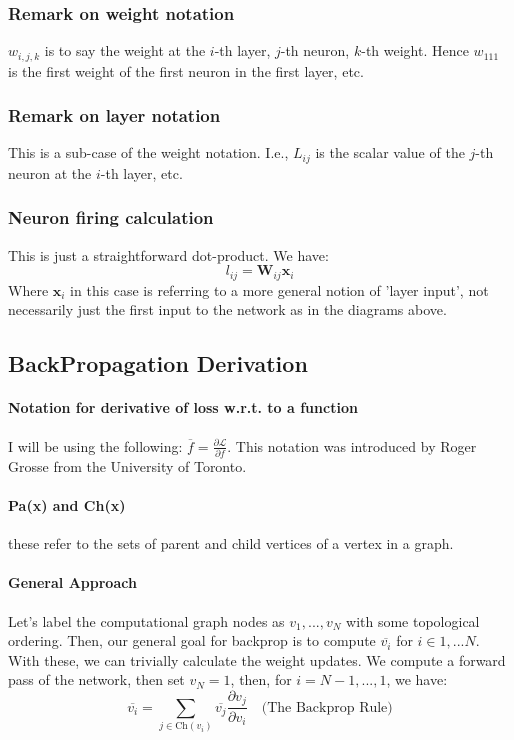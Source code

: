 \documentclass{article}
\begin{document}
\subsubsection{Remark on weight notation}
$w_{i,j,k}$ is to say the weight at the $i$-th layer, $j$-th neuron, $k$-th weight.
Hence $w_{111}$ is the first weight of the first neuron in the first layer, etc.
\subsubsection{Remark on layer notation}
This is a sub-case of the weight notation. I.e., $L_{ij}$ is the scalar value of the $j$-th neuron at the $i$-th layer, etc.
\subsubsection{Neuron firing calculation} This is just a straightforward dot-product. We have:
\[l_{ij}=\bm{W}_{ij}\bm{x}_i \]
Where $\bm{x}_i$ in this case is referring to a more general notion of 'layer input', not necessarily just the first input to the network as in the diagrams above.
\subsection{BackPropagation Derivation}
\paragraph{Notation for derivative of loss w.r.t. to a function} I will be using the following: $\overline{f} = \frac{\partial{\mathcal{L}}}{\partial{f}}$. This notation was introduced by Roger Grosse from the University of Toronto.
\paragraph{Pa(x) and Ch(x)} these refer to the sets of parent and child vertices of a vertex in a graph.
\paragraph{General Approach} Let's label the computational graph nodes as $v_1,...,v_N$ with some topological ordering. 
Then, our general goal for backprop is to compute $\overline{v_i}$ for $i \in {1,...N}$. With these, we can trivially calculate the weight updates.
We compute a forward pass of the network, then set $v_N=1$, then, for $i=N-1, ... , 1$, we have:
\begin{equation}
    \overline{v_i} = \sum_{j \in \text{Ch}(v_i)} \overline{v_j} \frac{\partial{v_j}}{\partial{v_i}} \quad  \text{(The Backprop Rule)}
\end{equation}
\end{document}
